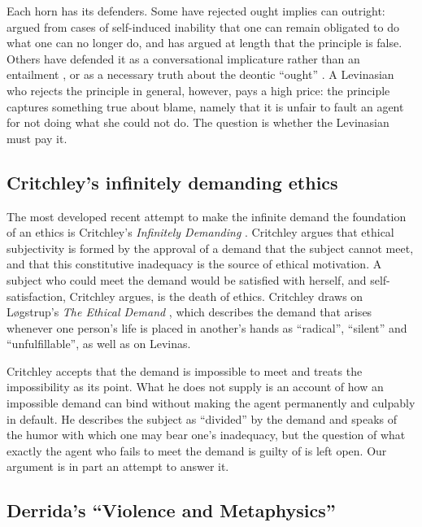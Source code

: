 \documentclass{situationist-preprint}
\begin{document}
Each horn has its defenders. Some have rejected ought implies can outright: \citet{Stocker1971} argued from cases of self-induced inability that one can remain obligated to do what one can no longer do, and \citet{Graham2011} has argued at length that the principle is false. Others have defended it as a conversational implicature rather than an entailment \citep{SinnottArmstrong1984}, or as a necessary truth about the deontic \enquote{ought} \citep{Vranas2007}. A Levinasian who rejects the principle in general, however, pays a high price: the principle captures something true about blame, namely that it is unfair to fault an agent for not doing what she could not do. The question is whether the Levinasian must pay it.

\subsection{Critchley's infinitely demanding ethics}

The most developed recent attempt to make the infinite demand the foundation of an ethics is Critchley's \emph{Infinitely Demanding} \citep{Critchley2007}. Critchley argues that ethical subjectivity is formed by the approval of a demand that the subject cannot meet, and that this constitutive inadequacy is the source of ethical motivation. A subject who could meet the demand would be satisfied with herself, and self-satisfaction, Critchley argues, is the death of ethics. Critchley draws on Løgstrup's \emph{The Ethical Demand} \citep{Logstrup1956}, which describes the demand that arises whenever one person's life is placed in another's hands as \enquote{radical}, \enquote{silent} and \enquote{unfulfillable}, as well as on Levinas.

Critchley accepts that the demand is impossible to meet and treats the impossibility as its point. What he does not supply is an account of how an impossible demand can bind without making the agent permanently and culpably in default. He describes the subject as \enquote{divided} by the demand and speaks of the humor with which one may bear one's inadequacy, but the question of what exactly the agent who fails to meet the demand is guilty of is left open. Our argument is in part an attempt to answer it.

\subsection{Derrida's \enquote{Violence and Metaphysics}}
\end{document}
